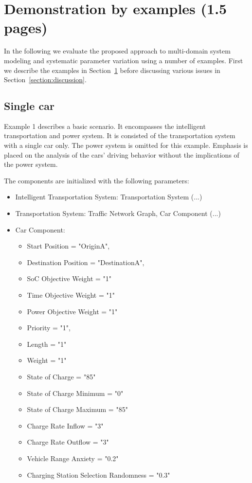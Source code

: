 \section{Demonstration by examples (1.5 pages)}
\label{section:evaluation}

In the following we evaluate the proposed approach to multi-domain system modeling and systematic parameter variation using a number of examples. First we describe the examples in Section~\ref{section:evaluation} before discussing various issues in Section~\ref{section:discussion}.

\subsection{Single car}
Example 1 describes a basic scenario. It encompasses the intelligent transportation and power system. It is consisted of the transportation system with a single car only. The power system is omitted for this example.
Emphasis is placed on the analysis of the cars' driving behavior without the implications of the power system. 

The components are initialized with the following parameters:

\begin{itemize}
	\item Intelligent Transportation System: Transportation System (...)
	\item Transportation System: Traffic Network Graph, Car Component (...)
	\item Car Component:
	\begin{itemize}  
		\item Start Position = "OriginA", 
		\item Destination Position = "DestinationA",
		\item SoC Objective Weight = "1" 
		\item Time Objective Weight = "1" 
		\item Power Objective Weight = "1"
		\item Priority = "1",
		\item Length = "1"
		\item Weight = "1"
		\item State of Charge = "85"
		\item State of Charge Minimum = "0"
		\item State of Charge Maximum = "85" 
		\item Charge Rate Inflow = "3" 
		\item Charge Rate Outflow = "3" 
		\item Vehicle Range Anxiety = "0.2" 
		\item Charging Station Selection Randomness = "0.3"
	\end{itemize}
\end{itemize}

